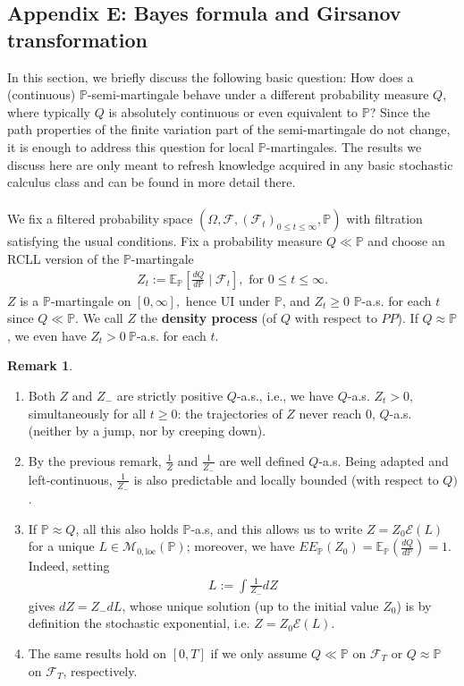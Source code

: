 \documentclass[12pt,a4paper, twoside]{article}
\theoremstyle{definition}
\newtheorem{rem}{Remark}[section]
\newcommand{\EE}{\mathbb{E}} %
\newcommand{\PP}{\mathbb{P}} %
\begin{document}
\subsection{Appendix E: Bayes formula and Girsanov transformation}
In this section, we briefly discuss the following basic question: How does a (continuous) $\PP$-semi-martingale behave under a different probability measure $Q$, where typically $Q$ is absolutely continuous or even equivalent to $\PP$? Since the path properties of the finite variation part of the semi-martingale do not change, it is enough to address this question for local $\PP$-martingales. The results we discuss here are only meant to refresh knowledge acquired in any basic stochastic calculus class and can be found in more detail there.
\\
\\
We fix a filtered probability space $( \Omega, \mathcal{F}, (\mathcal{F}_t)_{0 \leq t \leq \infty}, \PP)$ with filtration satisfying the usual conditions. Fix a probability measure $Q \ll \PP$ and choose an RCLL version of the $\PP$-martingale 
\begin{align*}
Z_t := \EE_\PP \left[ \frac{d Q}{d \PP} \mid \mathcal{F}_t \right], \text{ for } 0 \leq t \leq \infty. 
\end{align*}
$Z$ is a $\PP$-martingale on $[0, \infty],$ hence UI under $\PP$, and $Z_t \geq 0$ $\PP$-a.s. for each $t$ since $Q \ll \PP$. We call $Z$ the \textbf{density process} (of $Q$ with respect to $PP$). If $Q \approx \PP$, we even have $Z_t >0 \ \PP$-a.s. for each $t$. 
\begin{rem} \ 
\begin{enumerate}
\item Both $Z$ and $Z_-$ are strictly positive $Q$-a.s., i.e., we have $Q$-a.s. $Z_t>0$, simultaneously for all $t \geq 0$: the trajectories of $Z$ never reach $0$, $Q$-a.s. (neither by a jump, nor by creeping down).
\item By the previous remark, $\frac{1}{Z}$ and $\frac{1}{Z_-}$ are well defined $Q$-a.s. Being adapted and left-continuous, $\frac{1}{Z_-}$ is also predictable and locally bounded (with respect to $Q)$.
\item If $\PP \approx Q$, all this also  holds $\PP$-a.s, and this allows us to write $Z = Z_0 \mathcal{E}(L)$ for a unique $L \in \mathcal{M}_{0, \text{loc}}( \PP)$; moreover, we have $EE_\PP(Z_0)= \EE_\PP ( \frac{dQ}{d\PP})=1$. Indeed, setting
\begin{align*}
L:= \int \frac{1}{Z_-}d Z
\end{align*}
gives $dZ = Z_- dL$, whose unique solution (up to the initial value $Z_0$) is by definition the stochastic exponential, i.e. $Z = Z_0 \mathcal{E}(L)$. 
\item The same results hold on $[0,T]$ if we only assume $Q \ll \PP$ on $\mathcal{F}_T$ or $Q \approx \PP$ on $\mathcal{F}_T$, respectively. 
\end{enumerate}
\end{rem}
\end{document}
